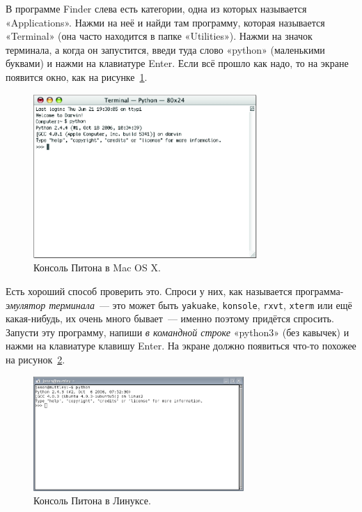 \begin{MAC}
В программе Finder слева есть категории, одна из которых называется «Applications». Нажми на неё и найди там программу, которая называется «Terminal» (она часто находится в папке «Utilities»). Нажми на значок терминала, а когда он запустится, введи туда слово «python» (маленькими буквами) и нажми на клавиатуре Enter. Если всё прошло как надо, то на экране появится окно, как на рисунке \ref{fig3}.

\begin{figure}
	\begin{center}
		\includegraphics[width=85mm]{../en/figure3.eps}
	\end{center}
	\caption{Консоль Питона в Mac OS X.}\label{fig3}
\end{figure}
\end{MAC}
\begin{LINUX}
Есть хороший способ проверить это. Спроси у них, как называется программа-\emph{эмулятор терминала} — это может быть \texttt{yakuake}, \texttt{konsole}, \texttt{rxvt}, \texttt{xterm} или ещё какая-нибудь, их очень много бывает — именно поэтому придётся спросить. Запусти эту программу, напиши \emph{в командной строке} «python3» (без кавычек) и нажми на клавиатуре клавишу Enter. На экране должно появиться что-то похожее на рисунок \ref{fig4}.

\begin{figure}
\begin{center}
\includegraphics[width=80mm]{../en/figure4.eps}
\end{center}
\caption{Консоль Питона в Линуксе.}\label{fig4}
\end{figure}
\end{LINUX}

